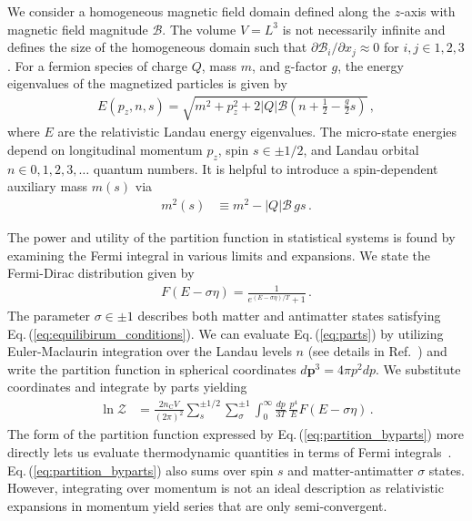 \documentclass[epjST]{svjour}
\newcommand{\req}[1]{Eq.\,(\ref{#1})}
\begin{document}
We consider a homogeneous magnetic field domain defined along the $z$-axis with magnetic field magnitude $\mathcal{B}$. The volume $V=L^{3}$ is not necessarily infinite and defines the size of the homogeneous domain such that $\partial\mathcal{B}_{i}/\partial x_{j}\approx0$ for \(i,j \in {1,2,3}\). For a fermion species of charge $Q$, mass $m$, and g-factor $g$, the energy eigenvalues of the magnetized particles is given by~\cite{Steinmetz:2018ryf}
\begin{align}
\label{eq:energystates}
E(p_{z},n,s)=\sqrt{m^{2}+p_{z}^{2}+2|Q|\mathcal{B}\left(n+\frac{1}{2}-\frac{g}{2}s\right)}\,,
\end{align}
where $E$ are the relativistic Landau energy eigenvalues. The micro-state energies depend on longitudinal momentum \(p_{z}\), spin $s\in\pm1/2$, and Landau orbital $n\in0,1,2,3,\ldots$ quantum numbers. It is helpful to introduce a spin-dependent auxiliary mass $m(s)$ via
\begin{align}
\label{eq:spinmass}
m^{2}(s) &\equiv m^{2} - |Q|\mathcal{B}\,g s\,.
\end{align}

The power and utility of the partition function in statistical systems is found by examining the Fermi integral in various limits and expansions. We state the Fermi-Dirac distribution given by
\begin{align}
F\left(E - \sigma\eta\right) = \frac{1}{e^{(E - \sigma\eta)/T} + 1}\,.
\end{align}
The parameter \(\sigma \in {\pm1}\) describes both matter and antimatter states satisfying \req{eq:equilibirum_conditions}. We can evaluate \req{eq:parts} by utilizing Euler-Maclaurin integration over the Landau levels \(n\) (see details in Ref.~\cite{Steinmetz:2023nsc}) and write the partition function in spherical coordinates \(d\mathbf{p}^{3}=4\pi p^{2}dp\). We substitute coordinates and integrate by parts yielding
\begin{align}
\label{eq:partition_byparts}
\ln\mathcal{Z} &= \frac{2 n_\mathrm{C}V}{(2\pi)^{2}} \sum_{s}^{\pm1/2}\sum_{\sigma}^{\pm1}\int_{0}^{\infty} \frac{dp}{3T} \, \frac{p^4}{E}F\left(E - \sigma\eta\right)\,.
\end{align}
The form of the partition function expressed by \req{eq:partition_byparts} more directly lets us evaluate thermodynamic quantities in terms of Fermi integrals~\cite{Elze:1980er,Birrell:2024bdb}. \req{eq:partition_byparts} also sums over spin \(s\) and matter-antimatter \(\sigma\) states. However, integrating over momentum is not an ideal description as relativistic expansions in momentum yield series that are only semi-convergent. 
\end{document}
